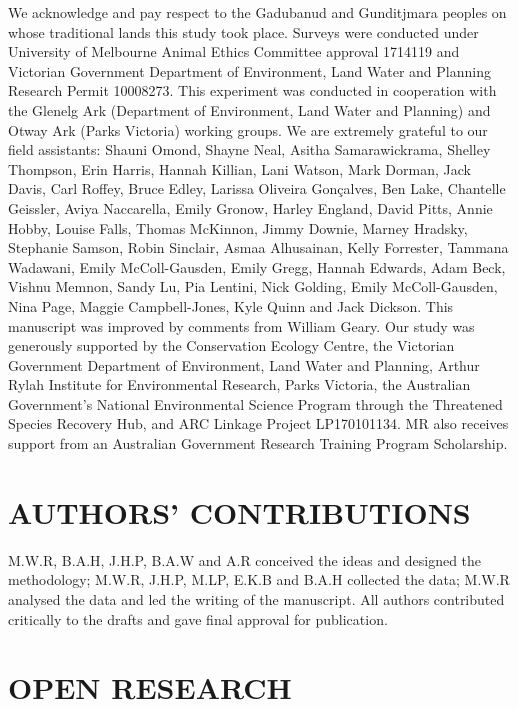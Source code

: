 \documentclass[]{elsarticle} %
\begin{document}
We acknowledge and pay respect to the Gadubanud and Gunditjmara peoples on whose traditional lands this study took place. Surveys were conducted under University of Melbourne Animal Ethics Committee approval 1714119 and Victorian Government Department of Environment, Land Water and Planning Research Permit 10008273. This experiment was conducted in cooperation with the Glenelg Ark (Department of Environment, Land Water and Planning) and Otway Ark (Parks Victoria) working groups. We are extremely grateful to our field assistants: Shauni Omond, Shayne Neal, Asitha Samarawickrama, Shelley Thompson, Erin Harris, Hannah Killian, Lani Watson, Mark Dorman, Jack Davis, Carl Roffey, Bruce Edley, Larissa Oliveira Gonçalves, Ben Lake, Chantelle Geissler, Aviya Naccarella, Emily Gronow, Harley England, David Pitts, Annie Hobby, Louise Falls, Thomas McKinnon, Jimmy Downie, Marney Hradsky, Stephanie Samson, Robin Sinclair, Asmaa Alhusainan, Kelly Forrester, Tammana Wadawani, Emily McColl-Gausden, Emily Gregg, Hannah Edwards, Adam Beck, Vishnu Memnon, Sandy Lu, Pia Lentini, Nick Golding, Emily McColl-Gausden, Nina Page, Maggie Campbell-Jones, Kyle Quinn and Jack Dickson. This manuscript was improved by comments from William Geary. Our study was generously supported by the Conservation Ecology Centre, the Victorian Government Department of Environment, Land Water and Planning, Arthur Rylah Institute for Environmental Research, Parks Victoria, the Australian Government's National Environmental Science Program through the Threatened Species Recovery Hub, and ARC Linkage Project LP170101134. MR also receives support from an Australian Government Research Training Program Scholarship.

\hypertarget{authors-contributions}{%
\section{AUTHORS' CONTRIBUTIONS}\label{authors-contributions}}

M.W.R, B.A.H, J.H.P, B.A.W and A.R conceived the ideas and designed the methodology; M.W.R, J.H.P, M.LP, E.K.B and B.A.H collected the data; M.W.R analysed the data and led the writing of the manuscript. All authors contributed critically to the drafts and gave final approval for publication.

\hypertarget{open-research}{%
\section{OPEN RESEARCH}\label{open-research}}
\end{document}
